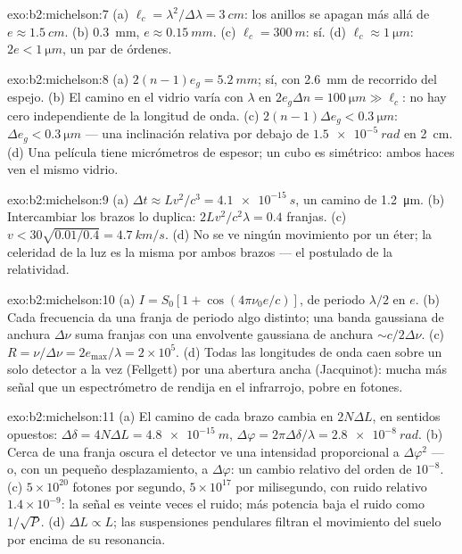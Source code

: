 \begin{solution}{exo:b2:michelson:7}
(a) $\ell_c = \lambda^2/\Delta\lambda = \qty{3}{cm}$: los anillos se apagan más allá de $e \approx \qty{1.5}{cm}$. (b)
\qty{0.3}{mm}, $e \approx \qty{0.15}{mm}$. (c) $\ell_c = \qty{300}{m}$: sí. (d) $\ell_c \approx \qty{1}{\micro m}$:
$2e < \qty{1}{\micro m}$, un par de órdenes.
\end{solution}

\begin{solution}{exo:b2:michelson:8}
(a) $2(n - 1)e_g = \qty{5.2}{mm}$; sí, con \qty{2.6}{mm} de recorrido del espejo. (b) El
camino en el vidrio varía con $\lambda$ en $2e_g\Delta n = \qty{100}{\micro m} \gg \ell_c$: no hay
cero independiente de la longitud de onda. (c) $2(n - 1)\Delta e_g < \qty{0.3}{\micro m}$: $\Delta e_g <
\qty{0.3}{\micro m}$ --- una inclinación relativa por debajo de $\qty{1.5e-5}{rad}$ en \qty{2}{cm}. (d) Una
película tiene micrómetros de espesor; un cubo es simétrico: ambos haces ven
el mismo vidrio.
\end{solution}

\begin{solution}{exo:b2:michelson:9}
(a) $\Delta t \approx Lv^2/c^3 = \qty{4.1e-15}{s}$, un camino de \qty{1.2}{\micro m}. (b) Intercambiar los
brazos lo duplica: $2Lv^2/c^2\lambda = 0.4$ franjas. (c) $v < 30\sqrt{0.01/0.4} =
\qty{4.7}{km/s}$. (d) No se ve ningún movimiento por un éter; la celeridad de la luz
es la misma por ambos brazos --- el postulado de la relatividad.
\end{solution}

\begin{solution}{exo:b2:michelson:10}
(a) $I = S_0[1 + \cos(4\pi\nu_0e/c)]$, de periodo $\lambda/2$ en $e$. (b) Cada frecuencia
da una franja de periodo algo distinto; una banda gaussiana de anchura
$\Delta\nu$ suma franjas con una envolvente gaussiana de anchura $\sim c/2\Delta\nu$.
(c) $R = \nu/\Delta\nu = 2e_{\max}/\lambda = 2 \times 10^5$. (d) Todas las longitudes de onda caen sobre
un solo detector a la vez (Fellgett) por una abertura ancha (Jacquinot):
mucha más señal que un espectrómetro de rendija en el infrarrojo,
pobre en fotones.
\end{solution}

\begin{solution}{exo:b2:michelson:11}
(a) El camino de cada brazo cambia en $2N\Delta L$, en sentidos opuestos: $\Delta\delta = 4N\Delta L
= \qty{4.8e-15}{m}$, $\Delta\varphi = 2\pi\Delta\delta/\lambda = \qty{2.8e-8}{rad}$. (b) Cerca de una franja
oscura el detector ve una intensidad proporcional a $\Delta\varphi^2$ --- o,
con un pequeño desplazamiento, a $\Delta\varphi$: un cambio relativo del orden de $10^{-8}$. (c)
$5 \times 10^{20}$ fotones por segundo, $5 \times 10^{17}$ por milisegundo, con ruido
relativo $1.4 \times 10^{-9}$: la señal es veinte veces el ruido; más potencia
baja el ruido como $1/\sqrt P$. (d) $\Delta L \propto L$; las suspensiones pendulares
filtran el movimiento del suelo por encima de su resonancia.
\end{solution}

